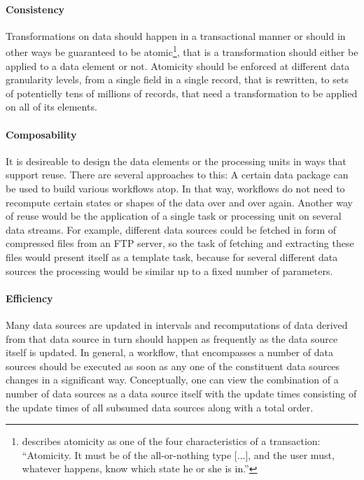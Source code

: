 \documentclass[english]{lni}
\begin{document}
\paragraph{Consistency}
Transformations on data should happen in a transactional manner
    or should in other ways be guaranteed to be atomic\footnote{\cite{haerder1983principles} describes atomicity as one of the four characteristics of a transaction: ``Atomicity. It must be of the all-or-nothing type [...], and the user must, whatever happens, know which state he or she is in.''}, that is a transformation
    should either be applied to a data element or not. Atomicity should be
    enforced at different data granularity levels, from a single field in a
    single record, that is rewritten, to sets of potentielly
    tens of millions of records, that need a transformation to be
    applied on all of its elements.

\paragraph{Composability}
It is desireable to design the data elements or the
    processing units in ways that support reuse.
    There are several approaches to this: A certain data package can be used to build various
    workflows atop. In that way, workflows do not need to recompute
    certain states or shapes of the data over and over again. Another way of reuse
    would be the application of a single task or processing unit on
    several data streams. For example, different data sources could be fetched
    in form of compressed files from an FTP server, so the task of fetching and
    extracting these files would present itself as a template task, because
    for several different data sources the processing would be similar up to a fixed number of parameters.

\paragraph{Efficiency} Many data sources are updated in intervals and
    recomputations of data derived from that data source in turn should
    happen as frequently as the data source itself is updated. In general,
    a workflow, that encompasses a number of data sources should be executed
    as soon as any one of the constituent data sources changes in a significant
    way. Conceptually, one can view the combination of a number of data sources as a data source
    itself with the update times consisting of the update times
    of all subsumed data sources along with a total order.
\end{document}
